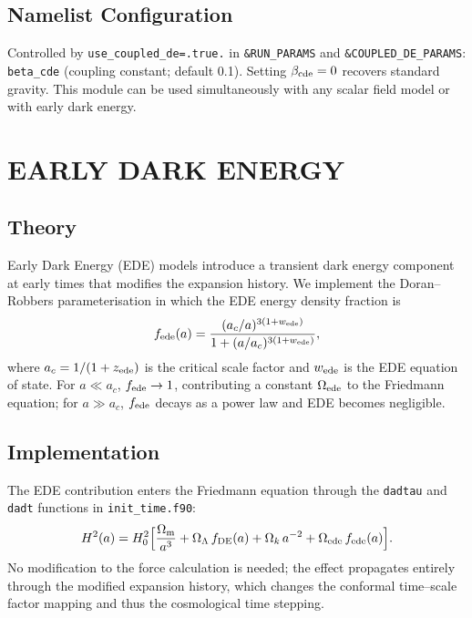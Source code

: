 \documentclass[fleqn,usenatbib]{mnras}
\newcommand{\code}[1]{\texttt{#1}}
\newcommand{\Om}{\Omega_{\rm m}}
\newcommand{\Ol}{\Omega_\Lambda}
\newcommand{\betacde}{\beta_{\rm cde}}
\newcommand{\Oede}{\Omega_{\rm ede}}
\begin{document}
\subsection{Namelist Configuration}

Controlled by \code{use\_coupled\_de=.true.} in
\code{\&RUN\_PARAMS} and \code{\&COUPLED\_DE\_PARAMS}:
\code{beta\_cde} (coupling constant; default 0.1).
Setting $\betacde = 0$ recovers standard gravity.
This module can be used simultaneously with any scalar field model
or with early dark energy.


\section{EARLY DARK ENERGY}
\label{sec:ede}

\subsection{Theory}

Early Dark Energy (EDE) models
\citep{DoranRobbers2006,Poulin2019,Hill2020} introduce a transient
dark energy component at early times that modifies the expansion
history.  We implement the Doran--Robbers parameterisation in which
the EDE energy density fraction is
\begin{equation}
f_{\rm ede}(a) = \frac{(a_c/a)^{3(1+w_{\rm ede})}}
  {1 + (a/a_c)^{3(1+w_{\rm ede})}},
\label{eq:f_ede}
\end{equation}
where $a_c = 1/(1+z_{\rm ede})$ is the critical scale factor
and $w_{\rm ede}$ is the EDE equation of state.  For
$a \ll a_c$, $f_{\rm ede} \to 1$, contributing a constant
$\Oede$ to the Friedmann equation; for $a \gg a_c$,
$f_{\rm ede}$ decays as a power law and EDE becomes negligible.

\subsection{Implementation}

The EDE contribution enters the Friedmann equation through the
\code{dadtau} and \code{dadt} functions in \code{init\_time.f90}:
\begin{equation}
H^2(a) = H_0^2\Bigl[\frac{\Om}{a^3} + \Ol\,f_{\rm DE}(a)
  + \Omega_k\,a^{-2} + \Oede\,f_{\rm ede}(a)\Bigr].
\label{eq:friedmann_ede}
\end{equation}
No modification to the force calculation is needed; the effect
propagates entirely through the modified expansion history, which
changes the conformal time--scale factor mapping and thus the
cosmological time stepping.
\end{document}
